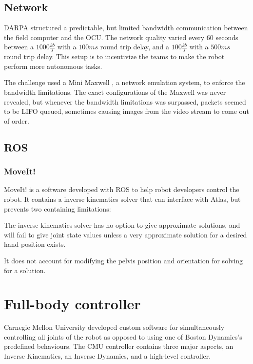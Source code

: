 \documentclass{article}
\begin{document}

\subsection{Network}

DARPA structured a predictable, but limited bandwidth communication between the field computer and the OCU. The network quality varied every 60 seconds between a $1000 \frac{kb}{s}$ with a $100ms$ round trip delay, and a $100 \frac{kb}{s}$ with a $500ms$ round trip delay. This setup is to incentivize the teams to make the robot perform more autonomous tasks.

The challenge used a Mini Maxwell \cite{minimaxwell}, a network emulation system, to enforce the bandwidth limitations. The exact configurations of the Maxwell was never revealed, but whenever the bandwidth limitations was surpassed, packets seemed to be LIFO queued, sometimes causing images from the video stream to come out of order. 

\subsection{ROS}


\subsubsection{MoveIt!}
MoveIt! is a software developed with ROS to help robot developers control the robot. It contains a inverse kinematics solver that can interface with Atlas, but prevents two containing limitations: 
\begin{inparaenum}
\item The inverse kinematics solver has no option to give approximate solutions, and will fail to give joint state values unless a very approximate solution for a desired hand position exists.
\item It does not account for modifying the pelvis position and orientation for solving for a solution. \end{inparaenum}

\section{Full-body controller}
Carnegie Mellon University developed custom software for simultaneously controlling all joints of the robot as opposed to using one of Boston Dynamics's predefined behaviours. The CMU controller contains three major aspects, an Inverse Kinematics, an Inverse Dynamics, and a high-level controller. 
\end{document}
